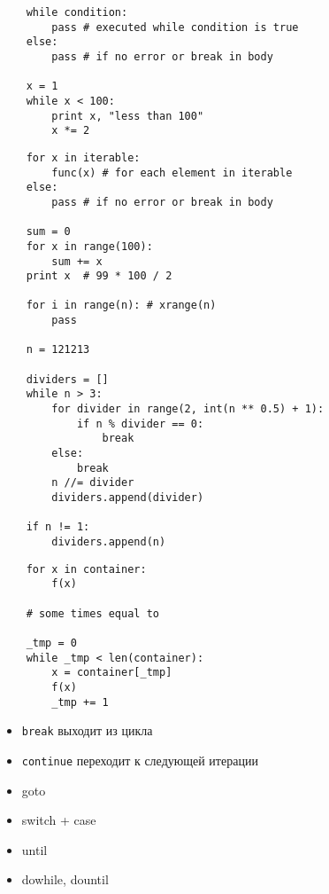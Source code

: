\documentclass{article}
\begin{document}
\vspace{15pt}
\begin{lstlisting}
	while condition:
		pass # executed while condition is true
	else:
		pass # if no error or break in body

	x = 1
	while x < 100:
		print x, "less than 100"
		x *= 2
\end{lstlisting}
\newpage

\vspace{15pt}
\begin{lstlisting}
	for x in iterable:
		func(x) # for each element in iterable
	else:
		pass # if no error or break in body

	sum = 0
	for x in range(100):
		sum += x
	print x  # 99 * 100 / 2

	for i in range(n): # xrange(n)
	    pass

	n = 121213

    dividers = []
    while n > 3:
        for divider in range(2, int(n ** 0.5) + 1):
            if n % divider == 0:
                break
        else:
            break
        n //= divider
        dividers.append(divider)

    if n != 1:
    	dividers.append(n)
\end{lstlisting}
\newpage

\vspace{15pt}
\begin{lstlisting}
	for x in container:
	    f(x)

	# some times equal to

	_tmp = 0
	while _tmp < len(container):
	    x = container[_tmp]
	    f(x)
	    _tmp += 1
\end{lstlisting}
\newpage

\begin{itemize}
	\item \lstinline!break!  выходит из цикла
	\item \lstinline!continue! переходит к следующей итерации
\end{itemize}
\newpage

\begin{itemize}
	\item goto 
	\item switch + case 
	\item until 
	\item do{}while, do{}until
\end{itemize}
\newpage
\end{document}
